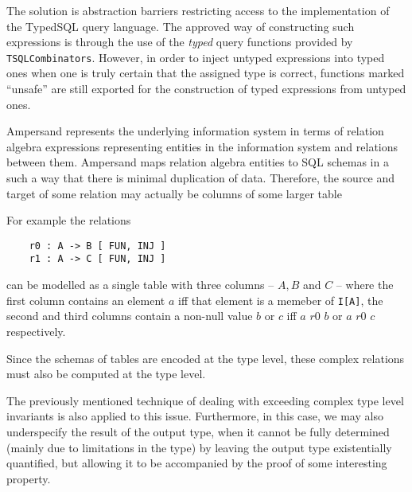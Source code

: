 \begin{description}[leftmargin=1em]
  The solution is abstraction barriers restricting access to the implementation of
  the TypedSQL query language. The approved way of constructing such expressions
  is through the use of the \emph{typed} query functions provided by
  \texttt{TSQLCombinators}. However, in order to inject untyped expressions
  into typed ones when one is truly certain that the assigned type is correct,
  functions marked ``unsafe'' are still exported for the construction of 
  typed expressions from untyped ones. 

\item[Relationship between SQL schemata and relation algebra]
  Ampersand represents the underlying information system in terms of relation algebra
  expressions representing entities in the information system and relations between them.
  Ampersand maps relation algebra entities to SQL schemas in a such a way that 
  there is minimal duplication of data. Therefore, the source and target of some 
  relation may actually be columns of some larger table 

  For example the relations 
  \begin{verbatim} 
    r0 : A -> B [ FUN, INJ ] 
    r1 : A -> C [ FUN, INJ ]  
  \end{verbatim}
  \vspace{-2em}
  can be modelled as a single table with three columns -- $A, B$ and $C$ --
  where the first column contains an element $a$ iff that element is a memeber
  of \texttt{I[A]}, the second and third columns contain a non-null value $b$ or
  $c$ iff $a\,\,r0\,\,b$ or $a\,\,r0\,\,c$ respectively. 

 Since the schemas of tables are encoded at the type level, these complex relations
  must also be computed at the type level.

  The previously mentioned technique of dealing with exceeding complex type level invariants
  is also applied to this issue. Furthermore, in this case, we may also underspecify the 
  result of the output type, when it cannot be fully determined (mainly due to limitations 
  in the type) by leaving the output type existentially quantified, but allowing it to 
  be accompanied by the proof of some interesting property. 

\end{description} 


